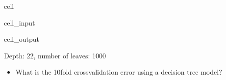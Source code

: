 \documentclass[letterpaper,10pt,english]{jupyterBook}
\begin{document}
\begin{sphinxuseclass}{cell}\begin{sphinxVerbatimInput}

\begin{sphinxuseclass}{cell_input}
\begin{sphinxVerbatim}[commandchars=\\\{\}]
\end{sphinxVerbatim}

\end{sphinxuseclass}\end{sphinxVerbatimInput}
\begin{sphinxVerbatimOutput}

\begin{sphinxuseclass}{cell_output}
\begin{sphinxVerbatim}[commandchars=\\\{\}]
Depth: 22, number of leaves: 1000
\end{sphinxVerbatim}

\end{sphinxuseclass}\end{sphinxVerbatimOutput}

\end{sphinxuseclass}\begin{itemize}
\item {} 
\sphinxAtStartPar
What is the 10\sphinxhyphen{}fold cross\sphinxhyphen{}validation error using a decision tree model?

\end{itemize}
\end{document}
